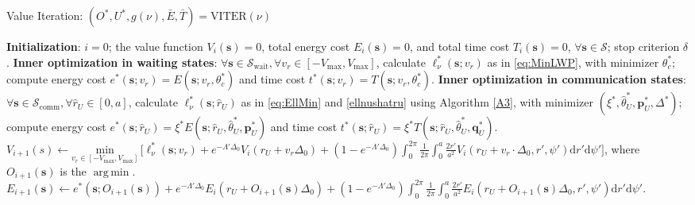 \documentclass[12pt, draftcls, onecolumn]{IEEEtran}
\theoremstyle{plain}
\theoremstyle{definition}
\theoremstyle{remark}
\DeclareMathOperator*{\argmin}{arg\,min}
\begin{document}
\begin{algorithm}[t]
\caption{Value Iteration: $(O^{*},U^{*},g(\nu),\bar{E},\bar{T})=\mathrm{VITER}(\nu)$}\label{A1}
    \begin{algorithmic}[1]
        \scriptsize
        \State \textbf{Initialization}: $i{=}0$; the value function $V_{i}(\mathbf{s}){=}0$, total energy cost $E_{i}(\mathbf{s}){=}0$, and total time cost $T_{i}(\mathbf{s}){=}0$, ${\forall}\mathbf{s}{\in}\mathcal{S}$; stop criterion $\delta$.
        \vspace{0.1cm}
    	\State \textbf{Inner optimization in waiting states}: ${\forall}\mathbf{s}{\in}\mathcal{S}_{\mathrm{wait}}, {\forall}v_{r}{\in}[-V_{\mathrm{max}},V_{\mathrm{max}}]$, calculate $\ell_{\nu}^{*}(\mathbf{s};v_{r})$ as in \eqref{eq:MinLWP}, with minimizer $\theta_{c}^{*}$; compute energy cost $e^{*}(\mathbf{s};v_{r}){=}E(\mathbf{s};v_{r},\theta_{c}^*)$ and time cost $t^{*}(\mathbf{s};v_r){=}T(\mathbf{s};v_{r},\theta_{c}^{*})$.
    	\vspace{0.1cm}
    	\State \textbf{Inner optimization in communication states}: ${\forall}\mathbf{s}{\in}\mathcal{S}_{\mathrm{comm}}, {\forall}\hat{r}_{U}{\in}[0,a]$, calculate $\ell_{\nu}^{*}(\mathbf{s};\hat{r}_{U})$ as in \eqref{eq:EllMin} and \eqref{ellnushatru} using Algorithm \ref{A3}, with minimizer $(\xi^{*},\hat{\theta}_{U}^{*},\mathbf{p}_{U}^{*},\Delta^{*})$; compute energy cost $e^{*}(\mathbf{s};\hat{r}_{U}){=}\xi^{*}E(\mathbf{s};\hat{r}_{U},\hat{\theta}_{U}^{*},\mathbf{p}_{U}^{*})$ and time cost $t^{*}(\mathbf{s};\hat{r}_{U}){=}\xi^{*}T(\mathbf{s};\hat{r}_{U},\hat{\theta}_{U}^{*},\mathbf{q}_{U}^{*})$.
    	\vspace{0.1cm}
        \Repeat
            \vspace{0.1cm}
        	    \vspace{0.1cm}
        		\State $V_{i{+}1}(s){\gets}\underset{v_{r}{\in}[-V_{\mathrm{max}},V_{\mathrm{max}}]}{\mathrm{min}}\, \big[\ell_{\nu}^{*}(\mathbf{s};v_{r}){+}e^{-\Lambda'\Delta_{0}}V_{i}(r_{U}{+}v_{r}\Delta_{0}){+} \left(1{-}e^{-\Lambda'\Delta_{0}}\right)\int_{0}^{2\pi}\frac{1}{2\pi}\int_{0}^{a}\frac{2r'}{a^{2}}V_{i}(r_{U}{+}v_{r}{\cdot}\Delta_{0},r',\psi')\mathrm{d}r'\mathrm{d}\psi'\big]$,
        		\vspace{0.1cm}
        		\Statex \hspace{2.0cm} where $O_{i{+}1}(\mathbf{s})$ is the $\argmin$.
        		\vspace{0.1cm}
        		\State $E_{i{+}1}(\mathbf{s}){\gets}e^{*}(\mathbf{s};O_{i{+}1}(\mathbf{s})){+}e^{-\Lambda'\Delta_{0}}E_{i}(r_{U}{+}O_{i{+}1}(\mathbf{s})\Delta_{0}){+}\left(1{-}e^{-\Lambda'\Delta_{0}}\right)\int_{0}^{2\pi}\frac{1}{2\pi}\int_{0}^{a}\frac{2r'}{a^{2}}E_{i}(r_{U}{+}O_{i{+}1}(\mathbf{s})\Delta_{0},r',\psi')\mathrm{d}r'\mathrm{d}\psi'$.

\end{algorithmic}
\end{algorithm}
\end{document}
